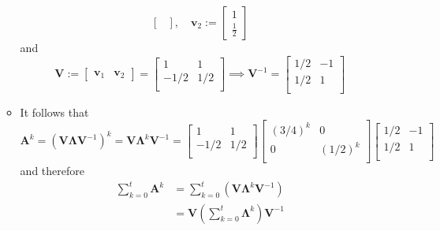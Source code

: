 \documentclass[12pt,a4paper]{article}
\begin{document}
\begin{itemize}
\begin{itemize}
\begin{equation}
\begin{bmatrix}
      \end{bmatrix},
      \quad
      \bm{v}_{2} :=
      \begin{bmatrix}
        1 \\
        \frac{1}{2}
      \end{bmatrix}
    \end{equation}
    and
    \begin{equation}\nonumber%
      \bm{V}:=
      \begin{bmatrix}
        \bm{v}_{1} & \bm{v}_{2}
      \end{bmatrix}
      =
      \begin{bmatrix}
        1 & 1 \\
        -1/2 & 1/2 \\
      \end{bmatrix}
      \implies
      \bm{V}^{-1} =
      \begin{bmatrix}
        1/2 & -1 \\
        1/2 & 1 \\
      \end{bmatrix}
    \end{equation}
  \item It follows that
    \begin{equation}\nonumber%
      \bm{A}^{k}
      =
      \left(\bm{V}\bm{\Lambda}\bm{V}^{-1}\right)^{k}
      =
      \bm{V}\bm{\Lambda}^{k}\bm{V}^{-1}
      =
      \begin{bmatrix}
        1 & 1 \\
        -1/2 & 1/2 \\
      \end{bmatrix}
      \begin{bmatrix}
        (3/4)^{k} & 0 \\
        0 & (1/2)^{k} \\
      \end{bmatrix}
      \begin{bmatrix}
        1/2 & -1 \\
        1/2 & 1 \\
      \end{bmatrix}
    \end{equation}
    and therefore
    \begin{align}
      \sum_{k=0}^{t}\bm{A}^{k}
        & = \sum_{k=0}^{t}\left(\bm{V}\bm{\Lambda}^{k}\bm{V}^{-1}\right)  \nonumber \\
        & = \bm{V}\left(\sum_{k=0}^{t}\bm{\Lambda}^{k}\right)\bm{V}^{-1}  \nonumber \\

\end{align}
\end{itemize}
\end{itemize}
\end{document}
